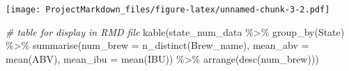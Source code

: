 \documentclass[
]{article}
\newenvironment{Shaded}{\begin{snugshade}}{\end{snugshade}}
\newcommand{\AttributeTok}[1]{\textcolor[rgb]{0.77,0.63,0.00}{#1}}
\newcommand{\CommentTok}[1]{\textcolor[rgb]{0.56,0.35,0.01}{\textit{#1}}}
\newcommand{\FunctionTok}[1]{\textcolor[rgb]{0.00,0.00,0.00}{#1}}
\newcommand{\NormalTok}[1]{#1}
\newcommand{\SpecialCharTok}[1]{\textcolor[rgb]{0.00,0.00,0.00}{#1}}
\begin{document}
\texttt{[image: ProjectMarkdown\_files/figure-latex/unnamed-chunk-3-2.pdf]}

\begin{Shaded}
\begin{Highlighting}[]
\CommentTok{\# table for display in RMD file}
\FunctionTok{kable}\NormalTok{(state\_num\_data }\SpecialCharTok{\%\textgreater{}\%} \FunctionTok{group\_by}\NormalTok{(State) }\SpecialCharTok{\%\textgreater{}\%}
\FunctionTok{summarise}\NormalTok{(}\AttributeTok{num\_brew =} \FunctionTok{n\_distinct}\NormalTok{(Brew\_name),}
\AttributeTok{mean\_abv =} \FunctionTok{mean}\NormalTok{(ABV), }\AttributeTok{mean\_ibu =} \FunctionTok{mean}\NormalTok{(IBU)) }\SpecialCharTok{\%\textgreater{}\%}
\FunctionTok{arrange}\NormalTok{(}\FunctionTok{desc}\NormalTok{(num\_brew)))}
\end{Highlighting}
\end{Shaded}
\end{document}
